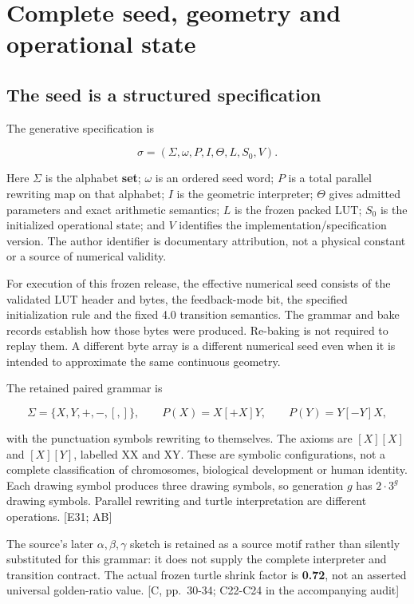 \documentclass[11pt,a4paper]{article}
\begin{document}
\section{Complete seed, geometry and operational
state}\label{complete-seed-geometry-and-operational-state}

\subsection{The seed is a structured
specification}\label{the-seed-is-a-structured-specification}

The generative specification is

\[
\sigma=(\Sigma,\omega,P,I,\Theta,L,S_0,V).
\]

Here \(\Sigma\) is the alphabet \textbf{set}; \(\omega\) is an ordered
seed word; \(P\) is a total parallel rewriting map on that alphabet;
\(I\) is the geometric interpreter; \(\Theta\) gives admitted parameters
and exact arithmetic semantics; \(L\) is the frozen packed LUT; \(S_0\)
is the initialized operational state; and \(V\) identifies the
implementation/specification version. The author identifier is
documentary attribution, not a physical constant or a source of
numerical validity.

For execution of this frozen release, the effective numerical seed
consists of the validated LUT header and bytes, the feedback-mode bit,
the specified initialization rule and the fixed 4.0 transition
semantics. The grammar and bake records establish how those bytes were
produced. Re-baking is not required to replay them. A different byte
array is a different numerical seed even when it is intended to
approximate the same continuous geometry.

The retained paired grammar is

\[
\Sigma=\{X,Y,+,-,[,]\},\qquad
P(X)=X[+X]Y,\qquad P(Y)=Y[-Y]X,
\]

with the punctuation symbols rewriting to themselves. The axioms are
\([X][X]\) and \([X][Y]\), labelled XX and XY. These are symbolic
configurations, not a complete classification of chromosomes, biological
development or human identity. Each drawing symbol produces three
drawing symbols, so generation \(g\) has \(2\cdot3^g\) drawing symbols.
Parallel rewriting and turtle interpretation are different operations.
{[}E31; AB{]}

The source's later \(\alpha,\beta,\gamma\) sketch is retained as a
source motif rather than silently substituted for this grammar: it does
not supply the complete interpreter and transition contract. The actual
frozen turtle shrink factor is \textbf{0.72}, not an asserted universal
golden-ratio value. {[}C, pp.~30-34; C22-C24 in the accompanying
audit{]}
\end{document}
